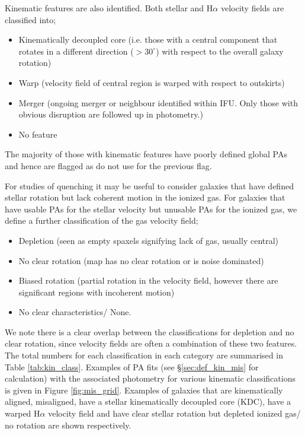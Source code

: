 \documentclass[fleqn,usenatbib]{mnras}
\begin{document}
Kinematic features are also identified. Both stellar and H$\alpha$ velocity fields are classified into;
\begin{itemize}
    \item Kinematically decoupled core (i.e. those with a central component that rotates in a different direction ($> 30^{\circ}$) with respect to the overall galaxy rotation)
    \item Warp (velocity field of central region is warped with respect to outskirts)
    \item Merger (ongoing merger or neighbour identified within IFU. Only those with obvious disruption are followed up in photometry.)
    \item No feature
\end{itemize}
The majority of those with kinematic features have poorly defined global PAs and hence are flagged as do not use for the previous flag. 

For studies of quenching it may be useful to consider galaxies that have defined stellar rotation but lack coherent motion in the ionized gas. For galaxies that have usable PAs for the stellar velocity but unusable PAs for the ionized gas, we define a further classification of the gas velocity field;
\begin{itemize}
    \item Depletion (seen as empty spaxels signifying lack of gas, usually central)
    \item No clear rotation (map has no clear rotation or is noise dominated)
    \item Biased rotation (partial rotation in the velocity field, however there are significant regions with incoherent motion)
    \item No clear characteristics/ None.
\end{itemize}
We note there is a clear overlap between the classifications for depletion and no clear rotation, since velocity fields are often a combination of these two features. The total numbers for each classification in each category are summarised in Table \ref{tab:kin_class}. Examples of PA fits (see \S\ref{sec:def_kin_mis} for calculation) with the associated photometry for various kinematic classifications is given in Figure \ref{fig:mis_grid}. Examples of galaxies that are kinematically aligned, misaligned, have a stellar kinematically decoupled core (KDC), have a warped H$\alpha$ velocity field and have clear stellar rotation but depleted ionized gas/ no rotation are shown respectively. 
\end{document}
